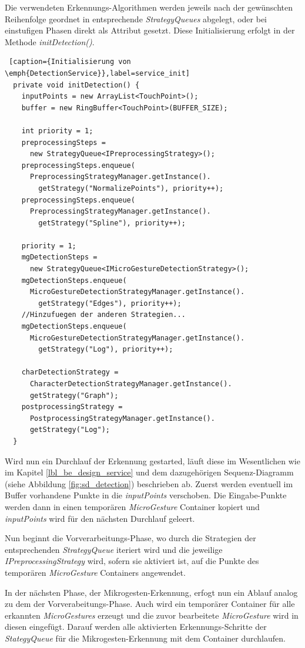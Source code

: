 Die verwendeten Erkennungs-Algorithmen werden jeweils nach der gewünschten Reihenfolge geordnet in entsprechende \emph{StrategyQueues} abgelegt, oder bei einstufigen Phasen direkt als Attribut gesetzt. Diese Initialisierung erfolgt in der Methode \emph{initDetection()}.
\newpage
\begin{lstlisting} [caption={Initialisierung von \emph{DetectionService}},label=service_init]
  private void initDetection() {
    inputPoints = new ArrayList<TouchPoint>();
    buffer = new RingBuffer<TouchPoint>(BUFFER_SIZE);
    
    int priority = 1;
    preprocessingSteps = 
      new StrategyQueue<IPreprocessingStrategy>();
    preprocessingSteps.enqueue(
      PreprocessingStrategyManager.getInstance().
        getStrategy("NormalizePoints"), priority++);
    preprocessingSteps.enqueue(
      PreprocessingStrategyManager.getInstance().
        getStrategy("Spline"), priority++);	

    priority = 1;
    mgDetectionSteps = 
      new StrategyQueue<IMicroGestureDetectionStrategy>();
    mgDetectionSteps.enqueue(
      MicroGestureDetectionStrategyManager.getInstance().
        getStrategy("Edges"), priority++);
    //Hinzufuegen der anderen Strategien...
    mgDetectionSteps.enqueue(
      MicroGestureDetectionStrategyManager.getInstance().
        getStrategy("Log"), priority++);

    charDetectionStrategy = 
      CharacterDetectionStrategyManager.getInstance().
      getStrategy("Graph");
    postprocessingStrategy = 
      PostprocessingStrategyManager.getInstance().
      getStrategy("Log");
  }
\end{lstlisting}

Wird nun ein Durchlauf der Erkennung gestarted, läuft diese im Wesentlichen wie im Kapitel \ref{lbl_be_design_service} und dem dazugehörigen Sequenz-Diagramm (siehe Abbildung \ref{fig:sd_detection}) beschrieben ab. Zuerst werden eventuell im Buffer vorhandene Punkte in die \emph{inputPoints} verschoben. Die Eingabe-Punkte werden dann in einen temporären \emph{MicroGesture} Container kopiert und \emph{inputPoints} wird für den nächsten Durchlauf geleert.

Nun beginnt die Vorverarbeitungs-Phase, wo durch die Strategien der entsprechenden \emph{StrategyQueue} iteriert wird und die jeweilige \emph{IPreprocessingStrategy} wird, sofern sie aktiviert ist, auf die Punkte des temporären \emph{MicroGesture} Containers angewendet.

In der nächsten Phase, der Mikrogesten-Erkennung, erfogt nun ein Ablauf analog zu dem der Vorverabeitungs-Phase. Auch wird ein temporärer Container für alle erkannten \emph{MicroGestures} erzeugt und die zuvor bearbeitete \emph{MicroGesture} wird in diesen eingefügt. Darauf werden alle aktivierten Erkennungs-Schritte der \emph{StategyQueue} für die Mikrogesten-Erkennung mit dem Container durchlaufen.

